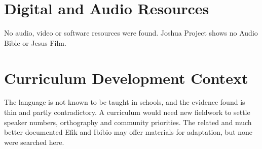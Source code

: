 \documentclass[12pt]{article}
\begin{document}
\section{Digital and Audio Resources}
No audio, video or software resources were found. Joshua Project shows no Audio Bible or Jesus Film.

\section{Curriculum Development Context}
The language is not known to be taught in schools, and the evidence found is thin and partly contradictory. A curriculum would need new fieldwork to settle speaker numbers, orthography and community priorities. The related and much better documented Efik and Ibibio may offer materials for adaptation, but none were searched here.
\end{document}
